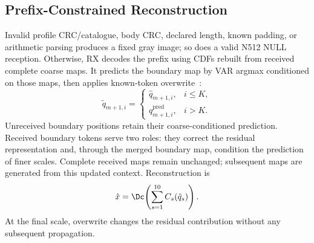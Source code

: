 \subsection{Prefix-Constrained Reconstruction}
Invalid profile CRC/catalogue, body CRC, declared length, known padding, or arithmetic parsing produces a fixed gray image; so does a valid N512 NULL reception. Otherwise, RX decodes the prefix using CDFs rebuilt from received complete coarse maps. It predicts the boundary map by VAR argmax conditioned on those maps, then applies known-token overwrite~\cite{var}:
\begin{equation}
 \tilde q_{m+1,i}=\begin{cases}\hat q_{m+1,i},&i\leq K,\\q^{\mathrm{pred}}_{m+1,i},&i>K.\end{cases}
 \label{eq:overwrite}
\end{equation}
Unreceived boundary positions retain their coarse-conditioned prediction. Received boundary tokens serve two roles: they correct the residual representation and, through the merged boundary map, condition the prediction of finer scales. Complete received maps remain unchanged; subsequent maps are generated from this updated context. Reconstruction is
\begin{equation}
 \hat x=\Dc\!\left(\sum_{s=1}^{10}C_s(\tilde q_s)\right).
 \label{eq:reconstruction}
\end{equation}
At the final scale, overwrite changes the residual contribution without any subsequent propagation.
